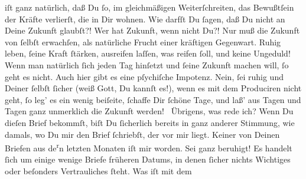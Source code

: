 \begin{ledgroupsized}[t]{13cm}
               iſt ganz natürlich, daß Du ſo, im gleichmäßigen {\pb}Weiterſchreiten, das Bewußtſein der Kräfte verlierſt, die in Dir wohnen.\pend
           \pstart
           Wie darfſt Du ſagen, daß Du nicht an Deine Zukunft glaubſt?! Wer hat Zukunft, wenn
               nicht Du?! Nur muß die Zukunft von ſelbſt erwachſen, als natürliche Frucht einer
               kräftigen Gegenwart. Ruhig leben, ſeine Kraft ſtärken, ausreifen laſſen, was reifen
               ſoll, und keine Ungeduld! Wenn man natürlich ſich jeden Tag hinſetzt und ſeine
               Zukunft machen will, ſo geht es nicht. Auch hier gibt es  eine pſychiſche Impotenz. Nein, ſei ruhig und Deiner ſelbſt ſicher (weiß Gott,
               Du kannſt es!), {\pb}wenn es mit  dem Produciren nicht geht, ſo leg’ es ein wenig
               beiſeite, ſchaffe Dir ſchöne Tage, und laß’ aus Tagen und Tagen ganz unmerklich die
               Zukunft werden! {\dotsfour}\pend
           \pstart
           Übrigens, was rede ich? Wenn Du dieſen Brief bekommſt, biſt Du ſicherlich bereits in
               ganz anderer Stimmung, wie damals, wo Du mir  den
               Brief ſchriebſt, der vor mir liegt.\pend
           \pstart
           Keiner von Deinen Briefen aus de\substVorne{}\textsuperscript{r}\substDazwischen{}n\substHinten{} letzten Monaten iſt mir \label{K_L02834-2v}\label{K_L02834-2h} worden. Sei ganz beruhigt! Es handelt ſich um einige wenige Briefe früheren
               Datums, in denen ſicher nichts Wichtiges oder beſonders Vertrauliches ſteht.\pend
           \pstart
           {\pb}Was iſt mit dem \label{K_L02834-3v}
\end{ledgroupsized}
